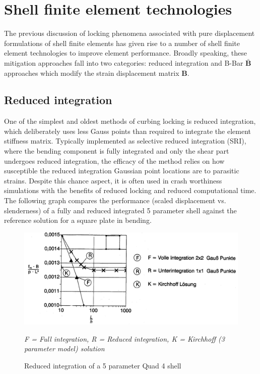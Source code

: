 \section{Shell finite element technologies}

The previous discussion of locking phenomena associated with pure displacement formulations of shell finite elements has given rise to a number of shell finite element technologies to improve element performance. Broadly speaking, these mitigation approaches fall into two categories: reduced integration and B-Bar $\bar{\mathbf{B}}$ approaches which modify the strain displacement matrix $\mathbf{B}$. 

\subsection{Reduced integration}

One of the simplest and oldest methods of curbing locking is reduced integration, which deliberately uses less Gauss points than required to integrate the element stiffness matrix. Typically implemented as selective reduced integration (SRI), where the bending component is fully integrated and only the shear part undergoes reduced integration, the efficacy of the method relies on how susceptible the reduced integration Gaussian point locations are to parasitic strains. Despite this chance aspect, it is often used in crash worthiness simulations with the benefits of reduced locking and reduced computational time. The following graph compares the performance (scaled displacement vs. slenderness) of a fully and reduced integrated 5 parameter shell against the reference solution for a square plate in bending.

\begin{figure}[H]
	\centering
	\def\svgwidth{\columnwidth}
	\includegraphics[width=14cm]{images/shearlockingredint.png}
	\caption{Reduced integration of a 5 parameter Quad 4 shell \cite{Bletz16}}
	\textit{F = Full integration, R = Reduced integration, K = Kirchhoff (3 parameter model) solution}
	\label{shearlockingredint}
\end{figure}

